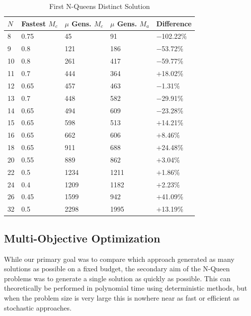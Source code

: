 \documentclass[conference]{IEEEtran}
\begin{document}
\begin{table}\label{table:firstsol}
\centering
\caption{First N-Queens Distinct Solution}
\begin{tabular}{|l|l|l|l|l|} \hline
$N$&    Fastest $M_{c}$&    $\mu$ Gens. $M_{c}$&    $\mu$ Gens. $M_{a}$&    Difference\\ \hline
 8&     0.75&               45&                     91&                     $-$102.22\%\\ \hline
 9&     0.8&                121&                    186&                    $-$53.72\%\\ \hline
10&     0.8&                261&                    417&                    $-$59.77\%\\ \hline
11&     0.7&                444&                    364&                    $+$18.02\%\\ \hline
12&     0.65&               457&                    463&                    $-$1.31\%\\ \hline
13&     0.7&                448&                    582&                    $-$29.91\%\\ \hline
14&     0.65&               494&                    609&                    $-$23.28\%\\ \hline
15&     0.65&               598&                    513&                    $+$14.21\%\\ \hline
16&     0.65&               662&                    606&                    $+$8.46\%\\ \hline
18&     0.65&               911&                    688&                    $+$24.48\%\\ \hline
20&     0.55&               889&                    862&                    $+$3.04\%\\ \hline
22&     0.5&                1234&                   1211&                   $+$1.86\%\\ \hline
24&     0.4&                1209&                   1182&                   $+$2.23\%\\ \hline
26&     0.45&               1599&                   942&                    $+$41.09\%\\ \hline
32&     0.5&                2298&                   1995&                   $+$13.19\%\\ \hline
\end{tabular}
\end{table}

\subsection{Multi-Objective Optimization}
While our primary goal was to compare which approach generated as many solutions as possible on a fixed budget, the secondary aim of the N-Queen problems was to generate a single solution as quickly as possible. This can theoretically be performed in polynomial time using deterministic methods, but when the problem size is very large this is nowhere near as fast or efficient as stochastic approaches.
\end{document}
